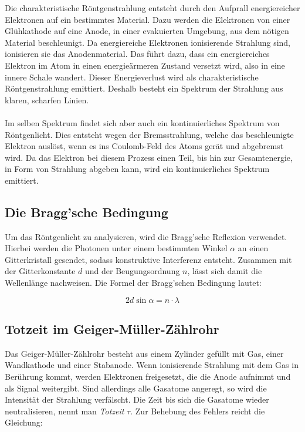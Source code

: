 Die charakteristische Röntgenstrahlung entsteht durch den Aufprall energiereicher Elektronen auf ein bestimmtes Material.
Dazu werden die Elektronen von einer Glühkathode auf eine Anode, in einer evakuierten Umgebung, aus dem nötigen Material beschleunigt.
Da energiereiche Elektronen ionisierende Strahlung sind, ionisieren sie das Anodenmaterial.
Das führt dazu, dass ein energiereiches Elektron im Atom in einen energieärmeren Zustand versetzt wird, also in eine innere Schale wandert.
Dieser Energieverlust wird als charakteristische Röntgenstrahlung emittiert. 
Deshalb besteht ein Spektrum der Strahlung aus klaren, scharfen Linien.
\\
\\
Im selben Spektrum findet sich aber auch ein kontinuierliches Spektrum von Röntgenlicht.
Dies entsteht wegen der Bremsstrahlung, welche das beschleunigte Elektron auslöst, wenn es ins Coulomb-Feld des Atoms gerät und abgebremst wird.
Da das Elektron bei diesem Prozess einen Teil, bis hin zur Gesamtenergie, in Form von Strahlung abgeben kann, wird ein kontinuierliches Spektrum emittiert.

\subsection{Die Bragg'sche Bedingung}

Um das Röntgenlicht zu analysieren, wird die Bragg'sche Reflexion verwendet.\\
Hierbei werden die Photonen unter einem bestimmten Winkel $\alpha$ an einen Gitterkristall gesendet, sodass konstruktive Interferenz entsteht.
Zusammen mit der Gitterkonstante $d$ und der Beugungsordnung $n$, lässt sich damit die Wellenlänge nachweisen.
Die Formel der Bragg'schen Bedingung lautet:

\begin{equation}
    2d\sin{\alpha} = n\cdot \lambda
    \label{eq:bragg}
\end{equation}

\subsection{Totzeit im Geiger-Müller-Zählrohr}

Das Geiger-Müller-Zählrohr besteht aus einem Zylinder gefüllt mit Gas, einer Wandkathode und einer Stabanode.
Wenn ionisierende Strahlung mit dem Gas in Berührung kommt, werden Elektronen freigesetzt, die die Anode aufnimmt und als Signal weitergibt.
Sind allerdings alle Gasatome angeregt, so wird die Intensität der Strahlung verfälscht. 
Die Zeit bis sich die Gasatome wieder neutralisieren, nennt man \textit{Totzeit} $\tau$.
Zur Behebung des Fehlers reicht die Gleichung:

